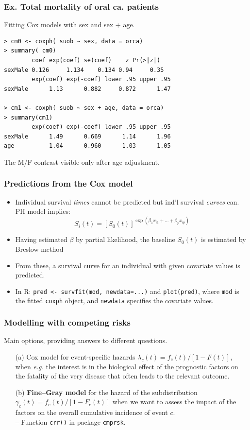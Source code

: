 \documentclass[handout,12pt,dvipsnames,t]{beamer}
\begin{document}
\begin{frame}[fragile]
\frametitle{Ex. Total mortality of oral ca. patients}

Fitting Cox models with sex and sex + age.
\small
\begin{verbatim}
> cm0 <- coxph( suob ~ sex, data = orca)
> summary( cm0)
        coef exp(coef) se(coef)    z Pr(>|z|)
sexMale 0.126     1.134    0.134 0.94     0.35
        exp(coef) exp(-coef) lower .95 upper .95
sexMale      1.13      0.882     0.872      1.47

> cm1 <- coxph( suob ~ sex + age, data = orca)
> summary(cm1)
        exp(coef) exp(-coef) lower .95 upper .95
sexMale      1.49      0.669      1.14      1.96
age          1.04      0.960      1.03      1.05
\end{verbatim}
\normalsize
The M/F contrast visible only after age-adjustment.
\end{frame}

\begin{frame}[fragile]
\frametitle{Predictions from the Cox model}
\begin{itemize}
\item
Individual survival \textit{times} cannot be predicted
but ind'l survival \emph{curves} can.
PH model implies:
\[
S_i(t) = [S_0(t) ]^{\exp(\beta_1 x_{i1} +\ldots+\beta_p x_{ip})}
\]
\item
Having  estimated $\beta$ by partial likelihood, 
the baseline $S_0(t)$ is estimated by Breslow method 
\item 
\medskip
 From these, a survival curve for an individual
with given covariate values is predicted.
\item
\medskip
In R: 
\texttt{pred <- survfit(mod, newdata=...)} 
and \texttt{plot(pred)}, where \texttt{mod} is the fitted
\texttt{coxph} object, 
and \texttt{newdata}  
specifies the covariate values.
\end{itemize}
\end{frame}

\begin{frame}
\frametitle{Modelling with competing risks}

Main options, providing answers to different questions.

\begin{itemize}
\item[(a)]
  Cox model for event-specific hazards $\lambda_c(t) = f_c(t)/[1-F(t)]$, when \textit{e.g.} the interest is in the biological effect of the prognostic factors on the fatality of the very disease that often leads to the relevant outcome.  
  \bigskip 
\item[(b)]
 \textbf{Fine--Gray model} for the hazard  of the subdistribution $\gamma_c(t) = f_c(t)/[1-F_c(t)]$ 
  when we want to assess the impact of the factors on the overall cumulative incidence of event $c$.  \\
  -- Function \texttt{crr()} in package \texttt{cmprsk}. 
\end{itemize}

\end{frame}
\end{document}

